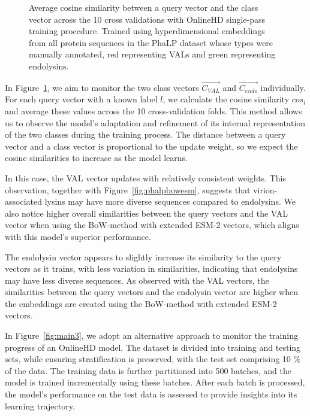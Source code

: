 \begin{figure}[htbp]
    \caption{Average cosine similarity between a query vector and the class vector across the 10 cross validations with OnlineHD single-pass training procedure. Trained using hyperdimensional embeddings from all protein sequences in the PhaLP dataset whose types were manually annotated, red representing VALs and green representing endolysins.}
    \label{fig:main}
\end{figure}

In Figure~\ref{fig:main}, we aim to monitor the two class vectors $\vec{C_{VAL}}$ and $\vec{C_{endo}}$ individually. For each query vector with a known label $l$, we calculate the cosine similarity $cos_{l}$ and average these values across the 10 cross-validation folds. This method allows us to observe the model's adaptation and refinement of its internal representation of the two classes during the training process. The distance between a query vector and a class vector is proportional to the update weight, so we expect the cosine similarities to increase as the model learns.

In this case, the VAL vector updates with relatively consistent weights. This observation, together with Figure~\ref{fig:phalpbowesm}, suggests that virion-associated lysins may have more diverse sequences compared to endolysins. We also notice higher overall similarities between the query vectors and the VAL vector when using the BoW-method with extended ESM-2 vectors, which aligns with this model's superior performance.

The endolysin vector appears to slightly increase its similarity to the query vectors as it trains, with less variation in similarities, indicating that endolysins may have less diverse sequences. As observed with the VAL vectors, the similarities between the query vectors and the endolysin vector are higher when the embeddings are created using the BoW-method with extended ESM-2 vectors.

In Figure~\ref{fig:main3}, we adopt an alternative approach to monitor the training progress of an OnlineHD model. The dataset is divided into training and testing sets, while ensuring stratification is preserved, with the test set comprising 10 \% of the data. The training data is further partitioned into 500 batches, and the model is trained incrementally using these batches. After each batch is processed, the model's performance on the test data is assessed to provide insights into its learning trajectory.

